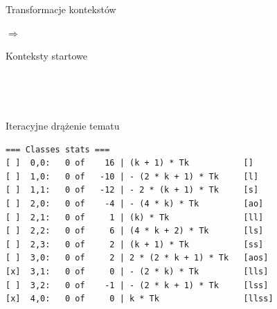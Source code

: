 \documentclass[final]{beamer}
\theoremstyle{bluetheorem}
\theoremstyle{bluetheorem}
\theoremstyle{greentheorem}
\newcommand{\includeinlinescaledsvg}[3]{\begin{minipage}{#1\textwidth}\begin{center}\end{center}\end{minipage}}
\begin{document}
\begin{frame}{Transformacje kontekstów}
    \begin{block}{}
        \begin{center}
            \includeinlinescaledsvg{.4}{.5}{lambda__contexts__def_001}%
            \(\Rightarrow\)
            \includeinlinescaledsvg{.4}{.5}{lambda__contexts__def_002}%
        \end{center}
    \end{block}
\end{frame}

\begin{frame}{Konteksty startowe}
    \begin{block}{}
        \begin{center}
            \includeinlinescaledsvg{.33}{.35}{lambda__contexts__type_001}%
            \includeinlinescaledsvg{.33}{.35}{lambda__contexts__type_002}%
            \includeinlinescaledsvg{.33}{.35}{lambda__contexts__type_003}\\%
            \includeinlinescaledsvg{.33}{.35}{lambda__contexts__type_004}%
            \includeinlinescaledsvg{.33}{.35}{lambda__contexts__type_004b}\\%
            \includeinlinescaledsvg{.33}{.35}{lambda__contexts__type_005}%
            \includeinlinescaledsvg{.33}{.35}{lambda__contexts__type_005b}%
        \end{center}
    \end{block}
\end{frame}

\begin{frame}[fragile]{Iteracyjne drążenie tematu}
    \begin{block}{}
\begin{lstlisting}
=== Classes stats ===
[ ]  0,0:   0 of    16 | (k + 1) * Tk           []
[ ]  1,0:   0 of   -10 | - (2 * k + 1) * Tk     [l]
[ ]  1,1:   0 of   -12 | - 2 * (k + 1) * Tk     [s]
[ ]  2,0:   0 of    -4 | - (4 * k) * Tk         [ao]
[ ]  2,1:   0 of     1 | (k) * Tk               [ll]
[ ]  2,2:   0 of     6 | (4 * k + 2) * Tk       [ls]
[ ]  2,3:   0 of     2 | (k + 1) * Tk           [ss]
[ ]  3,0:   0 of     2 | 2 * (2 * k + 1) * Tk   [aos]
[x]  3,1:   0 of     0 | - (2 * k) * Tk         [lls]
[ ]  3,2:   0 of    -1 | - (2 * k + 1) * Tk     [lss]
[x]  4,0:   0 of     0 | k * Tk                 [llss]
\end{lstlisting}
    \end{block}
\end{frame}
\end{document}
